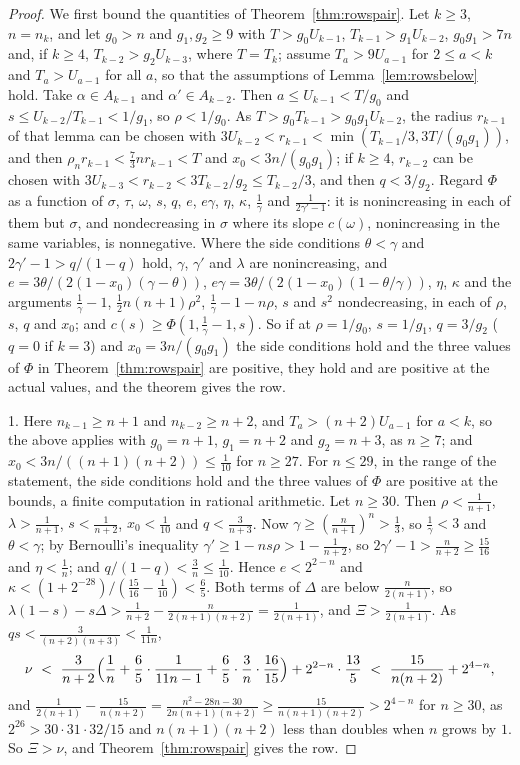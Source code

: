 \documentclass[11pt]{article}
\begin{document}
\begin{proof}
We first bound the quantities of Theorem~\ref{thm:rowspair}.  Let $k\ge3$,
$n=n_k$, and let $g_0>n$ and $g_1,g_2\ge9$ with $T>g_0U_{k-1}$,
$T_{k-1}>g_1U_{k-2}$, $g_0g_1>7n$ and, if $k\ge4$, $T_{k-2}>g_2U_{k-3}$,
where $T=T_k$; assume $T_a>9U_{a-1}$ for $2\le a<k$ and $T_a>U_{a-1}$ for
all $a$, so that the assumptions of Lemma~\ref{lem:rowsbelow} hold.  Take
$\alpha\in A_{k-1}$ and $\alpha'\in A_{k-2}$.  Then
$a\le U_{k-1}<T/g_0$ and $s\le U_{k-2}/T_{k-1}<1/g_1$, so $\rho<1/g_0$.
As $T>g_0T_{k-1}>g_0g_1U_{k-2}$, the radius $r_{k-1}$ of that lemma can be
chosen with $3U_{k-2}<r_{k-1}<\min(T_{k-1}/3,3T/(g_0g_1))$, and then
$\rho_nr_{k-1}<\frac73nr_{k-1}<T$ and $x_0<3n/(g_0g_1)$; if $k\ge4$,
$r_{k-2}$ can be chosen with $3U_{k-3}<r_{k-2}<3T_{k-2}/g_2\le T_{k-2}/3$,
and then $q<3/g_2$.  Regard $\Phi$ as a function of $\sigma$, $\tau$,
$\omega$, $s$, $q$, $e$, $e\gamma$, $\eta$, $\kappa$, $\frac1\gamma$ and
$\frac1{2\gamma'-1}$: it is nonincreasing in each of them but $\sigma$, and
nondecreasing in $\sigma$ where its slope $c(\omega)$, nonincreasing in the
same variables, is nonnegative.  Where the side conditions $\theta<\gamma$
and $2\gamma'-1>q/(1-q)$ hold, $\gamma$, $\gamma'$ and $\lambda$ are
nonincreasing, and $e=3\theta/(2(1-x_0)(\gamma-\theta))$,
$e\gamma=3\theta/(2(1-x_0)(1-\theta/\gamma))$, $\eta$, $\kappa$ and the
arguments $\frac1\gamma-1$, $\frac12n(n+1)\rho^2$, $\frac1\gamma-1-n\rho$,
$s$ and $s^2$ nondecreasing, in each of $\rho$, $s$, $q$ and $x_0$; and
$c(s)\ge\Phi(1,\frac1\gamma-1,s)$.  So if at $\rho=1/g_0$, $s=1/g_1$,
$q=3/g_2$ ($q=0$ if $k=3$) and $x_0=3n/(g_0g_1)$ the side conditions hold
and the three values of $\Phi$ in Theorem~\ref{thm:rowspair} are positive,
they hold and are positive at the actual values, and the theorem gives the
row.

1.  Here $n_{k-1}\ge n+1$ and $n_{k-2}\ge n+2$, and $T_a>(n+2)U_{a-1}$
for $a<k$, so the above applies with $g_0=n+1$, $g_1=n+2$ and $g_2=n+3$, as
$n\ge7$; and $x_0<3n/((n+1)(n+2))\le\frac1{10}$ for $n\ge27$.  For
$n\le29$, in the range of the statement, the side conditions hold and the
three values of $\Phi$ are positive at the bounds, a finite computation in
rational arithmetic.  Let $n\ge30$.  Then $\rho<\frac1{n+1}$,
$\lambda>\frac1{n+1}$, $s<\frac1{n+2}$, $x_0<\frac1{10}$ and
$q<\frac3{n+3}$.  Now
$\gamma\ge(\frac n{n+1})^n>\frac13$, so $\frac1\gamma<3$ and $\theta<\gamma$;
by Bernoulli's inequality $\gamma'\ge1-ns\rho>1-\frac1{n+2}$, so
$2\gamma'-1>\frac n{n+2}\ge\frac{15}{16}$ and $\eta<\frac1n$; and
$q/(1-q)<\frac3n\le\frac1{10}$.  Hence $e<2^{2-n}$ and
$\kappa<(1+2^{-28})/(\frac{15}{16}-\frac1{10})<\frac65$.  Both terms of
$\Delta$ are below $\frac n{2(n+1)}$, so
$\lambda(1-s)-s\Delta>\frac1{n+2}-\frac n{2(n+1)(n+2)}=\frac1{2(n+1)}$, and
$\Xi>\frac1{2(n+1)}$.  As $qs<\frac3{(n+2)(n+3)}<\frac1{11n}$,
\[
  \nu\ <\ \frac3{n+2}\Bigl(\frac1n+\frac65\cdot\frac1{11n-1}+\frac65\cdot\frac3n\cdot\frac{16}{15}\Bigr)
  +2^{2-n}\cdot\frac{13}5\ <\ \frac{15}{n(n+2)}+2^{4-n},
\]
and $\frac1{2(n+1)}-\frac{15}{n(n+2)}=\frac{n^2-28n-30}{2n(n+1)(n+2)}\ge\frac{15}{n(n+1)(n+2)}>2^{4-n}$
for $n\ge30$, as $2^{26}>30\cdot31\cdot32/15$ and $n(n+1)(n+2)$ less than
doubles when $n$ grows by $1$.  So $\Xi>\nu$, and Theorem~\ref{thm:rowspair} gives the row.


\end{proof}
\end{document}
